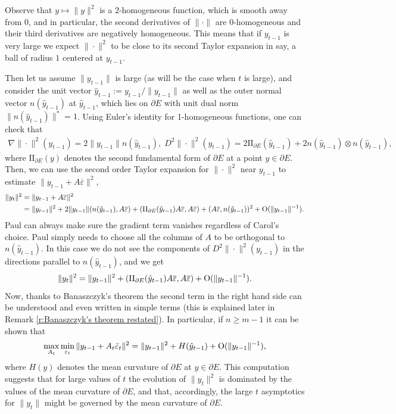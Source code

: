 \documentclass[reqno]{amsart}
\numberwithin{equation}{section}
\begin{document}
Observe that $y \mapsto \|y\|^2$ is a $2$-homogeneous function, which is smooth  away from $0$, and in particular, the second derivatives of $\|\cdot\|$ are $0$-homogeneous and their third derivatives are negatively homogeneous. This means that if $y_{t-1}$ is very large we expect $\|\cdot\|^2$ to be close to its second Taylor expansion in say, a ball of radius $1$ centered at $y_{t-1}$.

Then let us assume $\|y_{t-1}\|$ is large (as will be the case when $t$ is large), and consider the unit  vector $\hat y_{t-1} :=y_{t-1} /\|y_{t-1}\|$ as well as the outer normal vector $n (\hat y_{t-1})$ at $\hat y_{t-1}$, which lies on $\partial E$ with unit dual norm $\|n (\hat y_{t-1})\|^* =1$. Using Euler's identity for 1-homogeneous functions, one can check that 
\begin{align*}
  \nabla \|\cdot\|^2 (y_{t-1}) = 2\|y_{t-1}\|n(\hat y_{t-1}),\;D^2 \|\cdot\|^2 (y_{t-1}) = 2\text{II}_{\partial E}(\hat y_{t-1})+2n(\hat y_{t-1})\otimes n(\hat y_{t-1}),
\end{align*}
where $\text{II}_{\partial E}(y)$ denotes the second fundamental form of $\partial E$ at a point $y\in \partial E$. Then, we can use the second order Taylor expansion for $\|\cdot\|^2$ near $y_{t-1}$ to estimate $\|y_{t-1}+A\overline \varepsilon\|^2$, 
\begin{align*}
  \|y_t\|^2 & = \|y_{t-1}+A\overline\varepsilon\|^2 \\
    & = \|y_{t-1}\|^2 + 2\|y_{t-1}\|(n(\hat y_{t-1}),A\overline \varepsilon) + ( \text{II}_{\partial E}(\hat y_{t-1}) A\overline \varepsilon,A\overline \varepsilon) +(A\overline \varepsilon,n(\hat y_{t-1}))^2 + \textnormal{O}(\|y_{t-1}\|^{-1}).  
\end{align*}
Paul can always make sure the gradient term vanishes regardless of Carol's choice. Paul simply needs to choose all the columns of $A$ to be orthogonal to  $n(\hat y_{t-1})$. In this case we do not see the components of $D^2\|\cdot\|^2(y_{t-1})$ in the directions parallel to $n(\hat y_{t-1})$, and we get
\begin{align*}
  \|y_t\|^2 = \|y_{t-1}\|^2 + ( \text{II}_{\partial E}(\hat y_{t-1}) A\overline \varepsilon,A\overline \varepsilon) + \textnormal{O}(\|y_{t-1}\|^{-1}).  
\end{align*}
Now, thanks to Banaszczyk's theorem the second term in the right hand side can be understood and even written in simple terms (this is explained later in Remark \ref{r:Banaszczyk's theorem restated}). In particular, if $n \geq m-1$ it can be shown that
\begin{align*}
  \max_{A_t} \min_{\varepsilon_t} \|y_{t-1}+A_t\bar \varepsilon_t\|^2 = \|y_{t-1}\|^2 + H(\hat y_{t-1}) + \textnormal{O}(\|y_{t-1}\|^{-1}),
\end{align*}
where $H(y)$ denotes the mean curvature of $\partial E$ at $y\in\partial E$. This computation suggests that for large values of $t$ the evolution of $\|y_t\|^2$ is dominated by the values of the mean curvature of $\partial E$, and that, accordingly, the large $t$ asymptotics for $\|y_t\|$ might be governed by the mean curvature of $\partial E$. 
\end{document}
